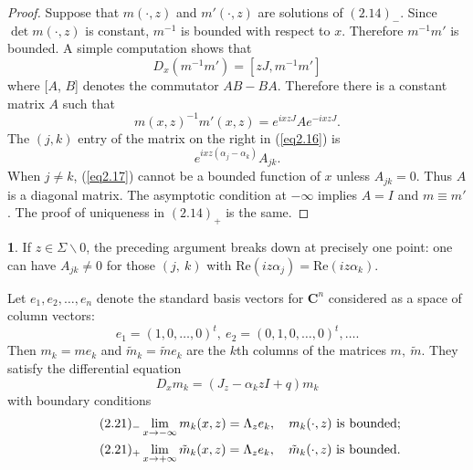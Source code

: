 \documentclass{surv-l}
\theoremstyle{plain}
\theoremstyle{definition}
\newtheorem{remark}[theorem]{\sc{Remark}}
\numberwithin{equation}{chapter}
\begin{document}
\begin{proof}
 Suppose that $m(\cdot, z)$ and $m'(\cdot,z)$ are solutions of $(2.14)_{-}$. Since $\det m(\cdot, z)$ is constant, $m^{-1}$ is bounded with respect to $x$. Therefore $m^{-1}m'$ is bounded. A simple computation shows that
\begin{equation*}
D_{x}(m^{-1}m')=[zJ, m^{-1}m']
\end{equation*}
where [$A$, $B$] denotes the commutator $AB-BA$. Therefore there is a constant matrix $A$ such that
\setcounter{equation}{15}
\begin{equation}\label{eq2.16}
m(x, z)^{-1}m'(x,z)=e^{ixzJ}Ae^{-ixzJ}.
\end{equation}
The $(j, k)$ entry of the matrix on the right in (\ref{eq2.16}) is
\begin{equation}\label{eq2.17}
e^{ixz(\alpha_{j}-\alpha_{k})}A_{j k}.
\end{equation}
When $j\neq k$, (\ref{eq2.17}) cannot be a bounded function of $x$ unless $A_{j k}=0$. Thus $A$ is a diagonal matrix. The asymptotic condition at $-\infty$ implies $A=I$ and $m\equiv m'$. The proof of uniqueness in $(2.14)_{+}$ is the same.
\end{proof}
\setcounter{theorem}{17}
\begin{remark}\label{eq2.18}
If $z\in\Sigma\backslash 0$, the preceding argument breaks down at precisely one point: one can have $A_{j k}\neq 0$ for those $(j,\ k)$ with $\mathrm{Re}(iz\alpha_{j})=\mathrm{Re}(iz\alpha_{k})$.
\end{remark}
Let $e_{1}, e_{2}, \ldots , e_{n}$ denote the standard basis vectors for $\mathbf{C}^{n}$ considered as a space of column vectors:
\setcounter{equation}{18}
\begin{equation}\label{eq2.19}
e_{1}=(1,0,\ldots,0)^{t},\ e_{2}=(0,1,0,\ldots, 0)^{t}, \ldots.
\end{equation}
Then $m_{k}=me_{k}$ and $\tilde{m}_{k}=\tilde{m}e_{k}$ are the $k$th columns of the matrices $m,\ \tilde{m}$. They satisfy the differential equation
\begin{equation}\label{eq2.20}
D_{x}m_{k}=(J_{z}-\alpha_{k}zI+q)m_{k}
\end{equation}
with boundary conditions\label{eq2.21-}
\begin{align*}\tag*{$(2.21)_{-}$}
& \mathop\mathrm{lim}_{x\rightarrow-\infty} m_{k}(x,z)=\Lambda_{z}e_{k},\quad m_{k}(\cdot,z)\ \text{is bounded}; \\
\label{eq2.21+}\tag*{$(2.21)_{+}$}&  \mathop\mathrm{lim}_{x\rightarrow+\infty}\tilde{m}_{k}(x,z)=\Lambda_{z}e_{k},\quad\tilde{m}_{k}(\cdot,z)\ \text{is bounded}.
\end{align*}
\end{document}
